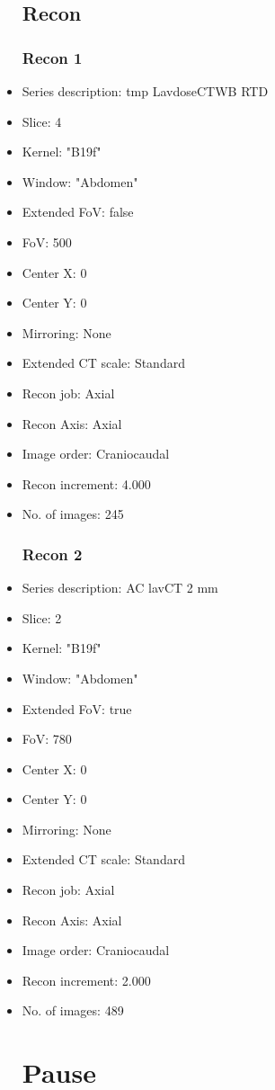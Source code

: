 \documentclass[12pt]{article}
\begin{document}
\begin{itemize}
\subsection{Recon}

\subsubsection{Recon 1}
\item Series description: tmp LavdoseCTWB RTD
\item Slice: 4
\item Kernel: "B19f"
\item Window: "Abdomen"
\item Extended FoV: false
\item FoV: 500
\item Center X: 0
\item Center Y: 0
\item Mirroring: None
\item Extended CT scale: Standard
\item Recon job: Axial
\item Recon Axis: Axial
\item Image order: Craniocaudal
\item Recon increment: 4.000
\item No. of images: 245
\subsubsection{Recon 2}
\item Series description: AC lavCT 2 mm
\item Slice: 2
\item Kernel: "B19f"
\item Window: "Abdomen"
\item Extended FoV: true
\item FoV: 780
\item Center X: 0
\item Center Y: 0
\item Mirroring: None
\item Extended CT scale: Standard
\item Recon job: Axial
\item Recon Axis: Axial
\item Image order: Craniocaudal
\item Recon increment: 2.000
\item No. of images: 489
\section{Pause}


\end{itemize}
\end{document}
